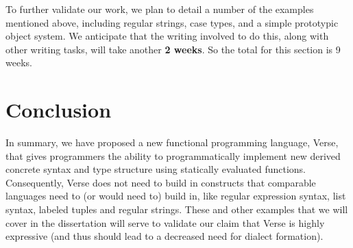 To further validate our work, we plan to detail a number of the examples mentioned above, including regular strings, case types, and a simple prototypic object system. We anticipate that the writing involved to do this, along with other writing tasks, will take another \textbf{2 weeks}. So the total for this section is 9 weeks.

\section{Conclusion}
In summary, we have proposed a new functional programming language, Verse, that gives programmers the ability to programmatically implement new derived concrete syntax and type structure using statically evaluated functions. Consequently, Verse does not need to build in constructs that comparable languages need to (or would need to) build in, like regular expression syntax, list syntax, labeled tuples and regular strings. These and other examples that we will cover in the dissertation will serve to validate our claim that Verse is highly expressive (and thus should lead to a decreased need for dialect formation).

